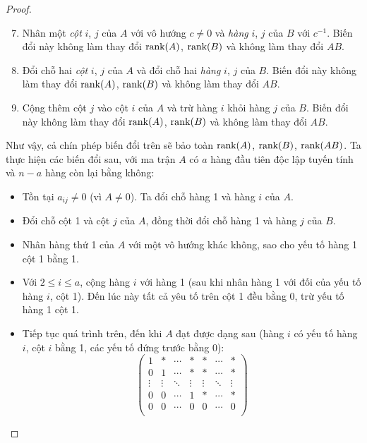 \documentclass[class=nhvh-linear-algebra,crop=false]{standalone}
\begin{document}
\begin{proof}
\begin{enumerate}[label = (\roman*)]
        \setcounter{enumi}{6}
        \item Nhân một \textit{cột} $i$, $j$ của $A$ với vô hướng $c\ne 0$ và \textit{hàng} $i$, $j$ của $B$ với $c^{-1}$. Biến đổi này không làm thay đổi $\text{rank}(A)$, $\text{rank}(B)$ và không làm thay đổi $AB$.
        \item Đổi chỗ hai \textit{cột} $i$, $j$ của $A$ và đổi chỗ hai \textit{hàng} $i$, $j$ của $B$. Biến đổi này không làm thay đổi $\text{rank}(A)$, $\text{rank}(B)$ và không làm thay đổi $AB$.
        \item Cộng thêm cột $j$ vào cột $i$ của $A$ và trừ hàng $i$ khỏi hàng $j$ của $B$. Biến đổi này không làm thay đổi $\text{rank}(A)$, $\text{rank}(B)$ và không làm thay đổi $AB$.
    \end{enumerate}
    \par Như vậy, cả chín phép biến đổi trên sẽ bảo toàn $\text{rank}(A)$, $\text{rank}(B)$, $\text{rank}(AB)$. Ta thực hiện các biến đổi sau, với ma trận $A$ có $a$ hàng đầu tiên độc lập tuyến tính và $n - a$ hàng còn lại bằng không:
    \begin{itemize}
        \item Tồn tại $a_{ij}\ne 0$ (vì $A\ne 0$). Ta đổi chỗ hàng 1 và hàng $i$ của $A$.
        \item Đổi chỗ cột 1 và cột $j$ của $A$, đồng thời đổi chỗ hàng 1 và hàng $j$ của $B$.
        \item Nhân hàng thứ 1 của $A$ với một vô hướng khác không, sao cho yếu tố hàng 1 cột 1 bằng 1.
        \item Với $2\le i\le a$, cộng hàng $i$ với hàng 1 (sau khi nhân hàng 1 với đối của yếu tố hàng $i$, cột 1). Đến lúc này tất cả yêu tố trên cột 1 đều bằng 0, trừ yếu tố hàng 1 cột 1.
        \item Tiếp tục quá trình trên, đến khi $A$ đạt được dạng sau (hàng $i$ có yếu tố hàng $i$, cột $i$ bằng 1, các yếu tố đứng trước bằng 0):
              \[
                  \begin{pmatrix}
                      1      & *      & \cdots & *      & *      & \cdots & *      \\
                      0      & 1      & \cdots & *      & *      & \cdots & *      \\
                      \vdots & \vdots & \ddots & \vdots & \vdots & \ddots & \vdots \\
                      0      & 0      & \cdots & 1      & *      & \cdots & *      \\
                      0      & 0      & \cdots & 0      & 0      & \cdots & 0      \\

\end{pmatrix}\]
\end{itemize}
\end{proof}
\end{document}
